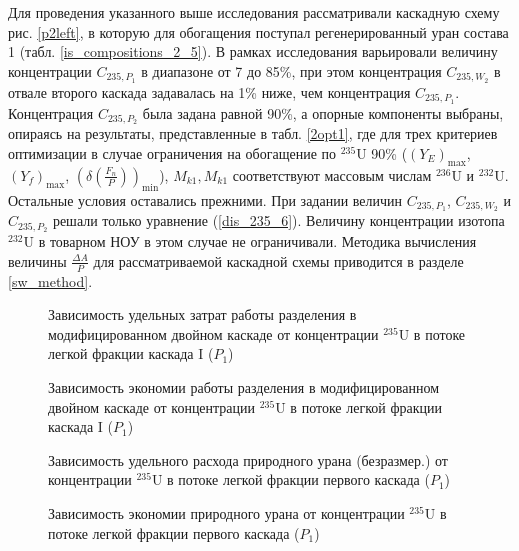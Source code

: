 Для проведения указанного выше исследования рассматривали каскадную схему рис. \ref{p2left}, в которую для обогащения поступал регенерированный уран состава 1 (табл. \ref{is_compositions_2_5}). В рамках исследования варьировали величину концентрации $C_{235,{P_1}}$ в диапазоне от 7 до 85\%, при этом концентрация $C_{235,{W_2}}$ в отвале второго каскада задавалась на 1\% ниже, чем концентрация $C_{235,{P_1}}$. Концентрация $C_{235,{P_2}}$ была задана равной 90\%, а опорные компоненты выбраны, опираясь на результаты, представленные в табл. \ref{2opt1}, где для трех критериев оптимизации в случае ограничения на обогащение по $^{235}$U 90\% ($(Y_{E})_\text{max}$, $(Y_f)_\text{max}$, $(\delta(\frac{F_n}{P}))_\text{min}$), $M_{k1}, M_{k1}$ соответствуют массовым числам $^{236}$U и $^{232}$U. Остальные условия оставались прежними. При задании величин $C_{235,{P_1}}$, $C_{235,{W_2}}$ и $C_{235,{P_2}}$  решали только уравнение (\ref{dis_235_6}). Величину концентрации изотопа $^{232}$U в товарном НОУ в этом случае не ограничивали.
Методика вычисления величины $\frac{\Delta A}{P}$ для рассматриваемой каскадной схемы приводится в разделе \ref{sw_method}.
\begin{figure}[ht]
    \centering
    \begin{minipage}{.5\textwidth}
        \centering
        
  \caption{{Зависимость удельных затрат работы разделения в модифицированном двойном каскаде  от концентрации $^{235}$U в потоке легкой фракции каскада I ($P_1$){\label{SWP1}}}}
  \end{minipage}%
    \begin{minipage}{.5\textwidth}
      \centering
      
\caption{{Зависимость экономии работы разделения в модифицированном двойном каскаде от концентрации $^{235}$U в потоке легкой фракции каскада I ($P_1$){\label{SW_lP1}}}}
    \end{minipage}
\end{figure}

\begin{figure}[ht]
    \centering
    \begin{minipage}{.5\textwidth}
        \centering
        
  \caption{{Зависимость удельного расхода природного урана (безразмер.) от концентрации $^{235}$U в потоке легкой фракции первого каскада ($P_1$){\label{FnuP1}}}}
  \end{minipage}%
    \begin{minipage}{.5\textwidth}
      \centering
      
\caption{{Зависимость экономии природного урана от концентрации $^{235}$U в потоке легкой фракции первого каскада ($P_1$){\label{pFoP1}}}}
    \end{minipage}
\end{figure}


